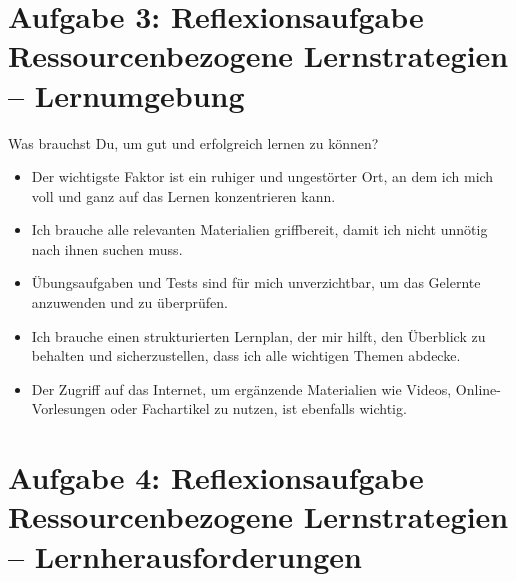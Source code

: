 \documentclass[10pt, oneside]{article}
\begin{document}
\begin{enumerate}[(a)]
\end{enumerate}

\section{Aufgabe 3: Reflexionsaufgabe Ressourcenbezogene Lernstrategien – Lernumgebung}

Was brauchst Du, um gut und erfolgreich lernen zu können?

\begin{itemize}
    \item Der wichtigste Faktor ist ein ruhiger und ungestörter Ort, an dem ich
        mich voll und ganz auf das Lernen konzentrieren kann.
    \item Ich brauche alle relevanten Materialien griffbereit, damit ich nicht
        unnötig nach ihnen suchen muss.
    \item Übungsaufgaben und Tests sind für mich unverzichtbar, um das Gelernte
        anzuwenden und zu überprüfen.
    \item Ich brauche einen strukturierten Lernplan, der mir hilft, den
        Überblick zu behalten und sicherzustellen, dass ich alle wichtigen
        Themen abdecke.
    \item Der Zugriff auf das Internet, um ergänzende Materialien wie Videos,
        Online-Vorlesungen oder Fachartikel zu nutzen, ist ebenfalls wichtig.
\end{itemize}

\section{Aufgabe 4: Reflexionsaufgabe Ressourcenbezogene Lernstrategien – Lernherausforderungen}
\end{document}
